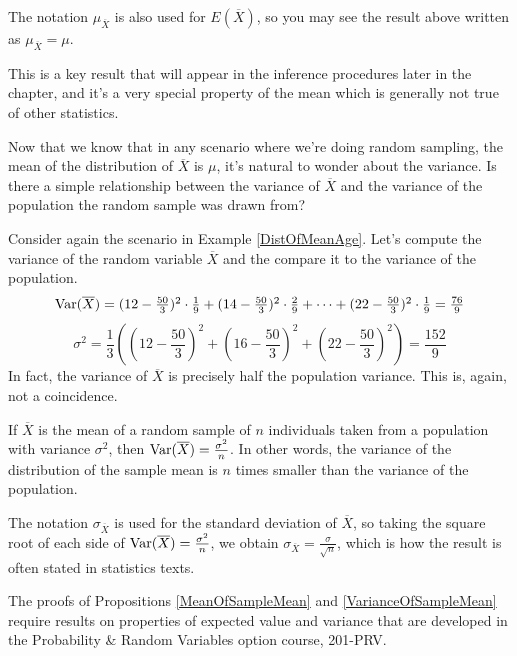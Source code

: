 \begin{remark}
The notation $\mu_{\overline{X}}$ is also used for $E(\overline{X})$, so you may see the result above written as $\mu_{\overline{X}} = \mu$.
\end{remark}

This is a key result that will appear in the inference procedures later in the chapter, and it's a very special property of the mean which is generally not true of other statistics.

Now that we know that in any scenario where we're doing random sampling, the mean of the distribution of $\overline{X}$ is $\mu$, it's natural to wonder about the variance. Is there a simple relationship between the variance of $\overline{X}$ and the variance of the population the random sample was drawn from?

\begin{example}
Consider again the scenario in Example \ref{DistOfMeanAge}. Let's compute the variance of the random variable $\overline{X}$ and the compare it to the variance of the population.
$$\operatorname{Var}(\overline{X}) = (12 - \textstyle\frac{50}{3})^2 \cdot \frac{1}{9} + (14 - \textstyle\frac{50}{3})^2 \cdot \frac{2}{9} + \dots + (22 - \textstyle\frac{50}{3})^2 \cdot \frac{1}{9} = \frac{76}{9}$$
$$\sigma^2 = \textstyle\frac{1}{3}\left((12-\frac{50}{3})^2 + (16-\frac{50}{3})^2 + (22-\frac{50}{3})^2 \right) = \frac{152}{9}$$
In fact, the variance of $\overline{X}$ is precisely half the population variance. This is, again, not a coincidence.
\end{example}

\begin{proposition}\label{VarianceOfSampleMean}
If $\overline{X}$ is the mean of a random sample of $n$ individuals taken from a population with variance $\sigma^2$, then $\operatorname{Var}(\overline{X}) = \frac{\sigma^2}{n}$. In other words, the variance of the distribution of the sample mean is $n$ times smaller than the variance of the population.
\end{proposition}

\begin{remark}
The notation $\sigma_{\overline{X}}$ is used for the standard deviation of $\overline{X}$, so taking the square root of each side of $\operatorname{Var}(\overline{X}) = \frac{\sigma^2}{n}$, we obtain $\sigma_{\overline{X}} = \frac{\sigma}{\sqrt{n}}$, which is how the result is often stated in statistics texts.
\end{remark}

The proofs of Propositions \ref{MeanOfSampleMean} and \ref{VarianceOfSampleMean} require results on properties of expected value and variance that are developed in the Probability \& Random Variables option course, 201-PRV.

